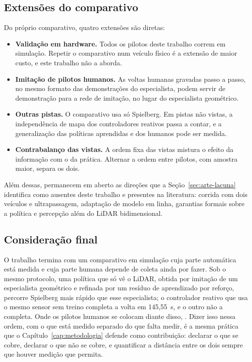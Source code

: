 \subsection*{Extensões do comparativo}

Do próprio comparativo, quatro extensões são diretas:

\begin{itemize}
    \item \textbf{Validação em hardware.} Todos os pilotos deste trabalho correm
          em simulação. Repetir o comparativo num veículo físico é a extensão de
          maior custo, e este trabalho não a aborda.
    \item \textbf{Imitação de pilotos humanos.} As voltas humanas gravadas passo a
          passo, no mesmo formato das demonstrações do especialista, podem servir
          de demonstração para a rede de imitação, no lugar do especialista
          geométrico.
    \item \textbf{Outras pistas.} O comparativo usa só Spielberg. Em pistas não
          vistas, a independência de mapa dos controladores reativos passa a
          contar, e a generalização das políticas aprendidas e dos humanos pode ser
          medida.
    \item \textbf{Contrabalanço das vistas.} A ordem fixa das vistas mistura o
          efeito da informação com o da prática. Alternar a ordem entre pilotos,
          com amostra maior, separa os dois.
\end{itemize}

Além dessas, permanecem em aberto as direções que a Seção~\ref{sec:arte-lacuna}
identifica como ausentes deste trabalho e presentes na literatura: corrida com
dois veículos e ultrapassagem, adaptação de modelo em linha, garantias formais
sobre a política e percepção além do LiDAR bidimensional.

\subsection*{Consideração final}

O trabalho termina com um comparativo em simulação cuja parte automática está
medida e cuja parte humana depende de coleta ainda por fazer. Sob o mesmo
protocolo, uma política que só vê o LiDAR, obtida por imitação de um especialista
geométrico e refinada por um resíduo de aprendizado por reforço, percorre
Spielberg mais rápido que esse especialista; o controlador reativo que usa o mesmo
sensor sem treino completa a volta em 145,55~s, e o outro não a completa. Onde os pilotos humanos se colocam diante disso,
. Dizer isso nessa ordem, com o
que está medido separado do que falta medir, é a mesma prática que o
Capítulo~\ref{cap:metodologia} defende como contribuição: declarar o que se
cobre, declarar o que não se cobre, e quantificar a distância entre os dois sempre
que houver medição que permita.
